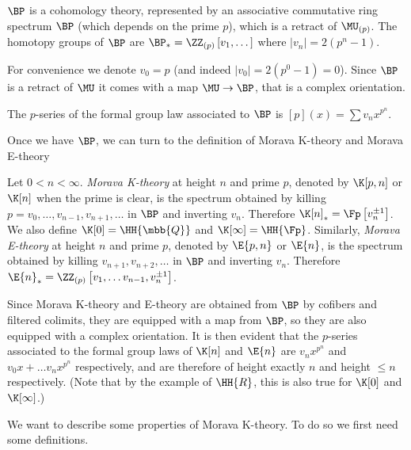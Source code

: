 \begin{theorem}
	$\BP$ is a cohomology theory, represented by an associative commutative ring spectrum $\BP$ (which depends on the prime $p$), which is a retract of $\MU_{\left(p\right)}$.
	The homotopy groups of $\BP$ are $\BP_* = \ZZ_{\left(p\right)}\left[v_1, \dotsc\right]$ where $\left|v_n\right| = 2\left(p^n-1\right)$.
\end{theorem}

For convenience we denote $v_0 = p$ (and indeed $\left|v_0\right| = 2\left(p^0-1\right) = 0$).
Since $\BP$ is a retract of $\MU$ it comes with a map $\MU \to \BP$, that is a complex orientation.

\begin{proposition}
	The $p$-series of the formal group law associated to $\BP$ is
	$\left[p\right]\left(x\right) = \sum v_n x^{p^n}$.
\end{proposition}

Once we have $\BP$, we can turn to the definition of Morava K-theory and Morava E-theory

\begin{definition}
	Let $0 < n < \infty$.
	\emph{Morava K-theory} at height $n$ and prime $p$, denoted by $\K[p,n]$ or $\K[n]$ when the prime is clear, is the spectrum obtained by killing $p=v_0, \dotsc, v_{n-1}, v_{n+1}, \dotsc$ in $\BP$ and inverting $v_n$.
	Therefore $\K[n]_* = \Fp\left[v_n^{\pm 1}\right]$.
	We also define $\K[0] = \HH{\mbb{Q}}$ and $\K[\infty] = \HH{\Fp}$.
	Similarly, \emph{Morava E-theory} at height $n$ and prime $p$, denoted by $\E{p,n}$ or $\E{n}$, is the spectrum obtained by killing $v_{n+1}, v_{n+2}, \dotsc$ in $\BP$ and inverting $v_n$.
	Therefore $\E{n}_* = \ZZ_{\left(p\right)}\left[v_1, \dotsc v_{n-1}, v_n^{\pm 1}\right]$.
\end{definition}

Since Morava K-theory and E-theory are obtained from $\BP$ by cofibers and filtered colimits, they are equipped with a map from $\BP$, so they are also equipped with a complex orientation.
It is then evident that the $p$-series associated to the formal group laws of $\K[n]$ and $\E{n}$ are $v_n x^{p^n}$ and $v_0 x + \dotsc v_n x^{p^n}$ respectively, and are therefore of height exactly $n$ and height $\leq n$ respectively.
(Note that by the example of $\HH{R}$, this is also true for $\K[0]$ and $\K[\infty]$.)

We want to describe some properties of Morava K-theory.
To do so we first need some definitions.

